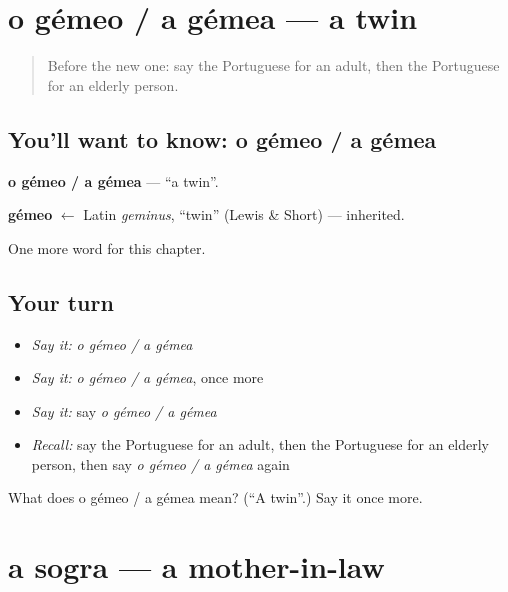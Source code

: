\section[o gémeo / a gémea]{o gémeo / a gémea — a twin}

\label{lesson:PT-C191-gemeo-a-gemea}



\begin{quote}
Before the new one: say the Portuguese for an adult, then the Portuguese for an elderly person.
\end{quote}

\subsection*{You'll want to know: o gémeo / a gémea}
\textbf{o gémeo / a gémea} — \textquotedblleft{}a twin\textquotedblright{}.

\begin{cousinweb}
\textbf{gémeo} $\leftarrow$ Latin \emph{geminus}, \textquotedblleft{}twin\textquotedblright{} (Lewis \& Short) — inherited.
\end{cousinweb}

\begin{grammarlens}[title={What you've built}]
One more word for this chapter.
\end{grammarlens}

\subsection*{Your turn}
\begin{itemize}
\raggedright
  \item \emph{Say it:} \emph{o gémeo / a gémea}
  \item \emph{Say it:} \emph{o gémeo / a gémea}, once more
  \item \emph{Say it:} say \emph{o gémeo / a gémea}
  \item \emph{Recall:} say the Portuguese for an adult, then the Portuguese for an elderly person, then say \emph{o gémeo / a gémea} again
\end{itemize}

\begin{tcolorbox}[breakable,colback=teal!4,colframe=teal!35!black,title={Before you move on}]
What does o gémeo / a gémea mean? (\textquotedblleft{}A twin\textquotedblright{}.) Say it once more.
\end{tcolorbox}
\section[a sogra]{a sogra — a mother-in-law}

